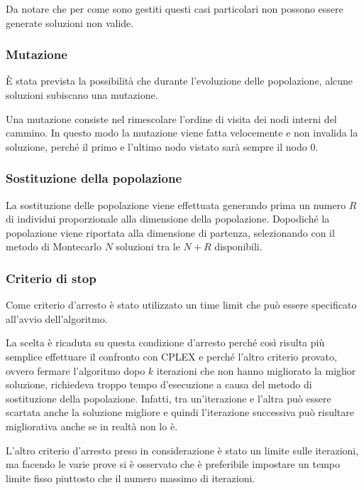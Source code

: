 Da notare che per come sono gestiti questi casi particolari non possono essere generate soluzioni non valide.

\subsubsection{Mutazione}

\`E stata prevista la possibilità che durante l'evoluzione delle popolazione, alcune soluzioni subiscano una mutazione.

Una mutazione consiste nel rimescolare l'ordine di visita dei nodi interni del cammino. In questo modo la mutazione viene fatta velocemente e non invalida la soluzione, perché il primo e l'ultimo nodo vistato sarà sempre il nodo 0.

\subsubsection{Sostituzione della popolazione}

La sostituzione delle popolazione viene effettuata generando prima un numero $R$ di individui proporzionale alla dimensione della popolazione. Dopodiché la popolazione viene riportata alla dimensione di partenza, selezionando con il metodo di Montecarlo $N$ soluzioni tra le $N+R$ disponibili.

\subsubsection{Criterio di stop}

Come criterio d'arresto è stato utilizzato un time limit che può essere specificato all'avvio dell'algoritmo.

La scelta è ricaduta su questa condizione d'arresto perché così risulta più semplice effettuare il confronto con CPLEX e perché l'altro criterio provato, ovvero fermare l'algoritmo dopo $k$ iterazioni che non hanno migliorato la miglior soluzione, richiedeva troppo tempo d'esecuzione a causa del metodo di sostituzione della popolazione.
Infatti, tra un'iterazione e l'altra può essere scartata anche la soluzione migliore e quindi l'iterazione successiva può risultare migliorativa anche se in realtà non lo è.

L'altro criterio d'arresto preso in considerazione è stato un limite sulle iterazioni, ma facendo le varie prove si è osservato che è preferibile impostare un tempo limite fisso piuttosto che il numero massimo di iterazioni.

